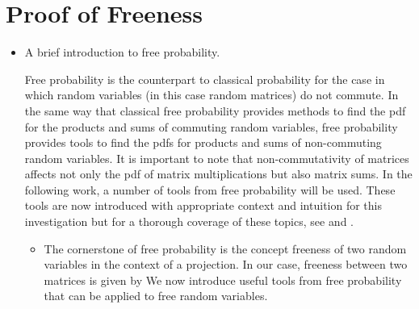 \documentclass[12pt,a4paper]{report}
\begin{document}
\section{Proof of Freeness}
\begin{itemize}

\item 
	A brief introduction to free probability.
	\par 
	Free probability is the counterpart to classical probability for the case in which random variables (in this case random matrices) do 
	not commute. In the same way that classical free probability provides methods to find the pdf for the products and sums of commuting random
	 variables, free probability provides tools to find the pdfs for products and sums of non-commuting random variables. It is important to note
	 that non-commutativity of matrices affects not only the pdf of matrix multiplications but also matrix sums. 
	In the following work, a number of tools from free probability will be used. These tools are now introduced with appropriate context and intuition 
	for this investigation but for a thorough coverage of these topics, see \cite{tulino2004random} and \cite{mingo2017free}.
	 \begin{itemize}
	 \item 
	 	The cornerstone of free probability is the concept freeness of two random variables in the context of a projection. In our case, freeness between two 
	 	matrices is given by 
	 	We now introduce useful tools from free probability  that can be applied to free random variables.


\end{itemize}
\end{itemize}
\end{document}
